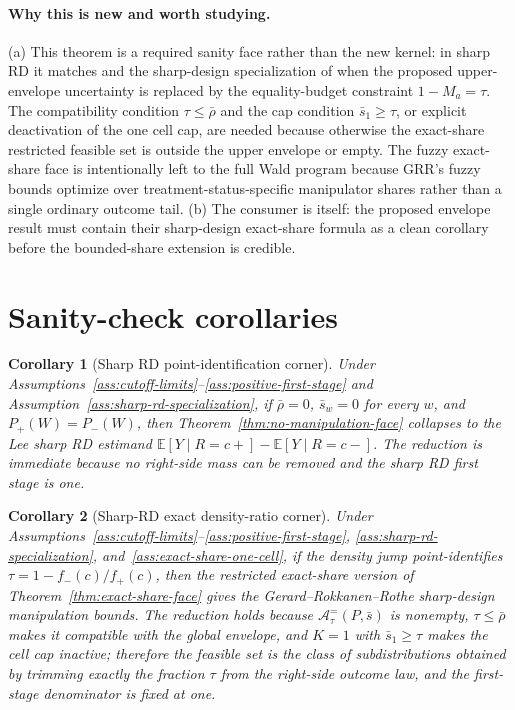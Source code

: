 \documentclass[11pt]{article}
\newcommand{\E}{\mathbb{E}}
\theoremstyle{definition}
\theoremstyle{plain}
\newtheorem{corollary}{Corollary}
\theoremstyle{remark}
\begin{document}
\paragraph{Why this is new and worth studying.}
(a) This theorem is a required sanity face rather than the new kernel: in sharp RD it
matches \citet{Lee2009} and the sharp-design specialization of
\citet{GerardRokkanenRothe2020} when the proposed upper-envelope uncertainty is replaced
by the equality-budget constraint \(1-M_a=\tau\).  The compatibility condition
\(\tau\le\bar\rho\) and the cap condition \(\bar s_1\ge\tau\), or explicit deactivation of
the one cell cap, are needed because otherwise the exact-share restricted feasible set is
outside the upper envelope or empty.
The fuzzy exact-share face is intentionally left to the full Wald program because GRR's
fuzzy bounds optimize over treatment-status-specific manipulator shares rather than a
single ordinary outcome tail.  (b) The consumer is \citet{GerardRokkanenRothe2020} itself:
the proposed envelope result must contain their sharp-design exact-share formula as a clean
corollary before the bounded-share extension is credible.

\section{Sanity-check corollaries}
\begin{corollary}[Sharp RD point-identification corner]\label{cor:sharp-rd-corner}
Under Assumptions~\ref{ass:cutoff-limits}--\ref{ass:positive-first-stage} and
Assumption~\ref{ass:sharp-rd-specialization}, if \(\bar\rho=0\), \(\bar s_w=0\) for every
\(w\), and \(P_+(W)=P_-(W)\), then
Theorem~\ref{thm:no-manipulation-face} collapses to the Lee sharp RD estimand
\(\E[Y\mid R=c+]-\E[Y\mid R=c-]\).  The reduction is immediate because no right-side mass
can be removed and the sharp RD first stage is one.
\end{corollary}

\begin{corollary}[Sharp-RD exact density-ratio corner]\label{cor:grr-corner}
Under Assumptions~\ref{ass:cutoff-limits}--\ref{ass:positive-first-stage},
\ref{ass:sharp-rd-specialization}, and~\ref{ass:exact-share-one-cell}, if the
density jump point-identifies \(\tau=1-f_-(c)/f_+(c)\), then the restricted exact-share version of
Theorem~\ref{thm:exact-share-face} gives the Gerard--Rokkanen--Rothe sharp-design
manipulation bounds.  The reduction holds because
\(\mathcal A^{=}_\tau(P,\bar s)\) is nonempty, \(\tau\le\bar\rho\) makes it compatible
with the global envelope, and \(K=1\) with \(\bar s_1\ge\tau\) makes the cell cap inactive;
therefore the feasible set is the class of subdistributions obtained by trimming exactly
the fraction \(\tau\) from the right-side outcome law, and the first-stage denominator is
fixed at one.
\end{corollary}
\end{document}
